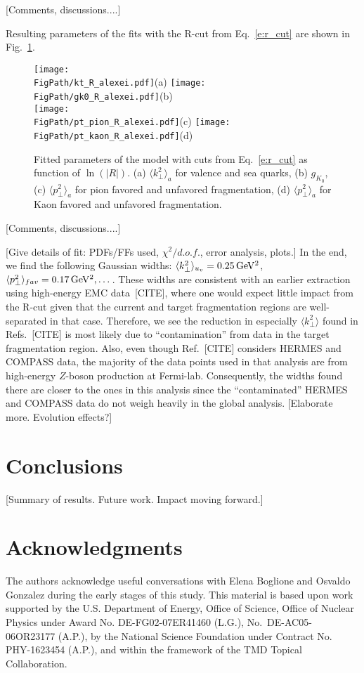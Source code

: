 \documentclass[final,3p,times,onecolumn,sort&compress,hidelinks]{elsarticle}
\newcommand\3[1]{\boldsymbol{#1}}
\newcommand*{\FigPath}{../Figs/}%
\begin{document}
[Comments, discussions....]
\newpage


Resulting parameters of the fits with  the R-cut from Eq.~\eqref{e:r_cut} 
are shown in Fig.~\ref{Fig:r_cut}.
\begin{figure}[htb!]
\centering
\texttt{[image: \\FigPath/kt\_R\_alexei.pdf]}{\tiny(a)}%
\texttt{[image: \\FigPath/gk0\_R\_alexei.pdf]}{\tiny(b)}\\%
\texttt{[image: \\FigPath/pt\_pion\_R\_alexei.pdf]}{\tiny(c)}%
\texttt{[image: \\FigPath/pt\_kaon\_R\_alexei.pdf]}{\tiny(d)}%
\caption{\label{Fig:r_cut}
Fitted parameters of the model with cuts from Eq.~\eqref{e:r_cut} as function of $\ln(|R|)$. (a) $\langle k_\perp^2 \rangle_a$ for valence and sea quarks,
(b) $g_{K_0}$,
(c) $\langle p_\perp^2 \rangle_a$ for pion favored and unfavored fragmentation, (d) $\langle p_\perp^2 \rangle_a$ for Kaon favored and unfavored fragmentation.
}
\end{figure}

[Comments, discussions....]
\newpage


[Give details of fit: PDFs/FFs used, $\chi^2/d.o.f.$, error analysis, plots.]  In the end, we find the following Gaussian widths: $\langle k_\perp^2\rangle_{u_v} = 0.25\,{\rm GeV^2}$, $\langle p_\perp^2\rangle_{fav} = 0.17\,{\rm GeV^2}, \dots$.  These widths are consistent with an earlier extraction using high-energy EMC data~[CITE], where one would expect little impact from the R-cut given that the current and target fragmentation regions are well-separated in that case.  Therefore, we see the reduction in especially $\langle k_\perp^2\rangle$ found in Refs.~[CITE] is most likely due to ``contamination'' from data in the target fragmentation region.  Also, even though Ref.~[CITE] considers HERMES and COMPASS data, the majority of the data points used in that analysis are from high-energy $Z$-boson production at Fermi-lab.  Consequently, the widths found there are closer to the ones in this analysis since the ``contaminated'' HERMES and COMPASS data do not weigh heavily in the global analysis.  [Elaborate more.  Evolution effects?]


\section{Conclusions}
\label{s:concl}
[Summary of results.  Future work.  Impact moving forward.]



 
\section*{Acknowledgments}
The authors acknowledge useful conversations with Elena Boglione and Osvaldo Gonzalez during the early stages of this study.
 This material is based upon work supported by the
U.S. Department of Energy, Office of Science, Office of Nuclear
Physics under Award No. DE-FG02-07ER41460 (L.G.), No.~DE-AC05-06OR23177 (A.P.), by the National Science Foundation 
under Contract No. PHY-1623454 (A.P.), and within the 
framework of the TMD Topical Collaboration.



\end{document}
